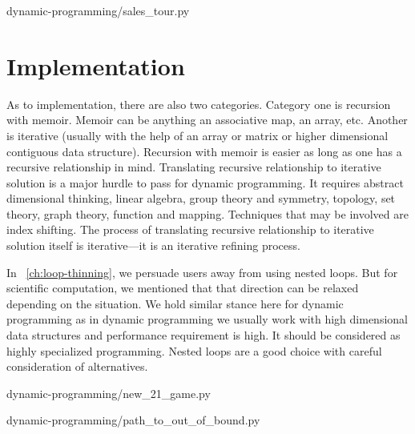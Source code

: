 \begin{clisting}
    
    {dynamic-programming/sales_tour.py}
\end{clisting}


\section{Implementation}\label{sec:dp-implementation}

As to implementation, there are also two categories.
Category one is recursion with memoir.
Memoir can be anything an associative map, an array, etc.
Another is iterative (usually with the help of an array or matrix or higher dimensional
contiguous data structure).
Recursion with memoir is easier as long as one has a recursive relationship in mind.
Translating recursive relationship to iterative solution is a major hurdle to pass for dynamic
programming.
It requires abstract dimensional thinking, linear algebra, group theory and symmetry, topology,
set theory, graph theory, function and mapping.
Techniques that may be involved are index shifting.
The process of translating recursive relationship to iterative solution itself is iterative---it
is an iterative refining process.

In ~\autoref{ch:loop-thinning}, we persuade users away from using nested loops.
But for scientific computation, we mentioned that that direction can be relaxed depending on the
situation.
We hold similar stance here for dynamic programming as in dynamic programming we usually work
with high dimensional data structures and performance requirement is high.
It should be considered as highly specialized programming.
Nested loops are a good choice with careful consideration of alternatives.

\begin{clisting}
    
    {dynamic-programming/new_21_game.py}
\end{clisting}

\begin{clisting}
    
    {dynamic-programming/path_to_out_of_bound.py}
\end{clisting}

